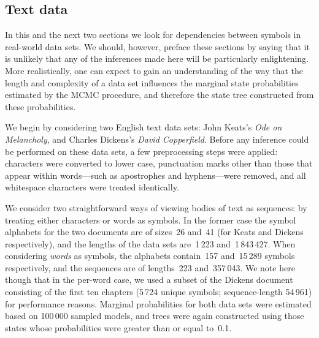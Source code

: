 \documentclass[11pt,a4paper]{article}
\begin{document}
\subsection{Text data}\label{sec:text} %

In this and the next two sections we look for dependencies between symbols in
real-world data sets. We should, however, preface these sections by saying that
it is unlikely that any of the inferences made here will be particularly
enlightening. More realistically, one can expect to gain an understanding of the
way that the length and complexity of a data set influences the marginal state
probabilities estimated by the MCMC procedure, and therefore the state tree
constructed from these probabilities.

We begin by considering two English text data sets: John Keats's \textit{Ode on
Melancholy}, and Charles Dickens's \textit{David Copperfield}. Before any
inference could be performed on these data sets, a few preprocessing steps were
applied: characters were converted to lower case, punctuation marks other than
those that appear within words---such as apostrophes and hyphens---were removed,
and all whitespace characters were treated identically.

We consider two straightforward ways of viewing bodies of text as sequences: by
treating either characters or words as symbols. In the former case the symbol
alphabets for the two documents are of sizes~26 and~41 (for Keats and Dickens
respectively), and the lengths of the data sets are~1\,223 and~1\,843\,427. When
considering \emph{words} as symbols, the alphabets contain~157 and~15\,289
symbols respectively, and the sequences are of lengths~223 and~357\,043. We note
here though that in the per-word case, we used a subset of the Dickens document
consisting of the first ten chapters (5\,724 unique symbols; sequence-length
54\,961) for performance reasons. Marginal probabilities for both data sets were
estimated based on 100\,000 sampled models, and trees were again constructed
using those states whose probabilities were greater than or equal to~0.1.
\end{document}
